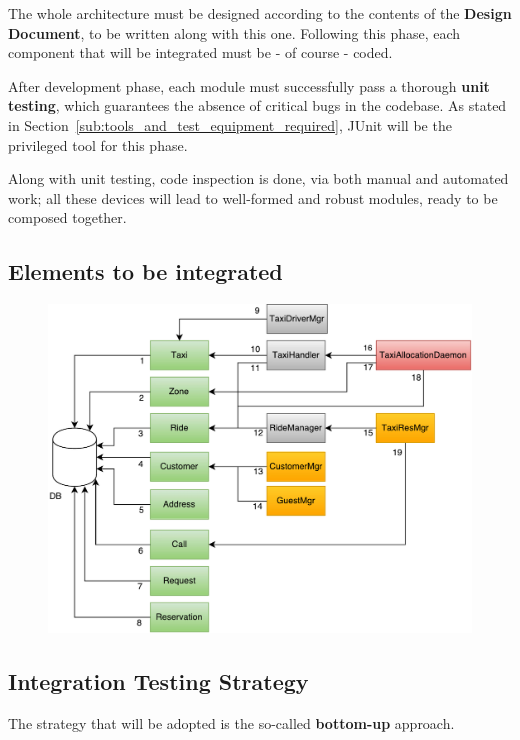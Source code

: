 \documentclass[a4paper, 12pt]{article}
\begin{document}
The whole architecture must be designed according to the contents of the \textbf{Design Document}, to be written along with this one.
Following this phase, each component that will be integrated must be - of course - coded.

After development phase, each module must successfully pass a thorough \textbf{unit testing}, which guarantees the absence of critical bugs in the codebase. As stated in Section~\ref{sub:tools_and_test_equipment_required}, JUnit will be the privileged tool for this phase.

Along with unit testing, code inspection is done, via both manual and automated work; all these devices will lead to well-formed and robust modules, ready to be composed together.

\subsection{Elements to be integrated}
\label{sub:elements_to_be_integrated}

\begin{figure}[htb]
    \centering
    \includegraphics[width=1.2\textwidth]{img/elements.pdf}
    \label{fig:testplan}
\end{figure}



\subsection{Integration Testing Strategy}
\label{sub:integration_testing_strategy}
The strategy that will be adopted is the so-called \textbf{bottom-up} approach.
\end{document}
